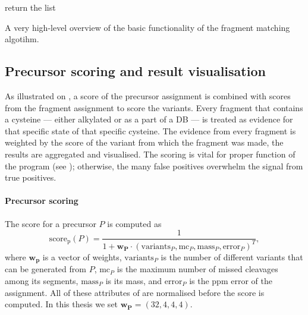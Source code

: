 \begin{algorithm}
\begin{algorithmic}

		\Else
		\label{alg:fragment:elongate}
		\EndIf
		\State return the list 
		\EndFunction
	\end{algorithmic}
	\caption{A very high-level overview of the basic functionality of the fragment matching algotihm.}\label{alg:fragment}
\end{algorithm}

\subsection{Precursor scoring and result visualisation}

As illustrated on , a score of the precursor assignment is combined with scores from the fragment assignment to score the variants. Every fragment that contains a cysteine --- either alkylated or as a part of a DB --- is treated as evidence for that specific state of that specific cysteine. The evidence from every fragment is weighted by the score of the variant from which the fragment was made, the results are aggregated and visualised. The scoring is vital for proper function of the program (see ); otherwise, the many false positives overwhelm the signal from true positives.

\paragraph{Precursor scoring} The score for a precursor \(P\) is computed as \[\operatorname{score_p}(P) = \frac{1}{1 + \bm{w_P} \cdot (\mathrm{variants}_P, \mathrm{mc}_P, \mathrm{mass}_P, \mathrm{error}_P)^T},\] where \(\bm{w_p}\) is a vector of weights, \(\mathrm{variants}_P\) is the number of different variants that can be generated from \(P\), \(\mathrm{mc}_P\) is the maximum number of missed cleavages among its segments, \(\mathrm{mass}_P\) is its mass, and \(\mathrm{error}_P\) is the ppm error of the assignment. All of these attributes of are normalised before the score is computed. In this thesis we set \(\bm{w_P} = (32, 4, 4, 4)\).

